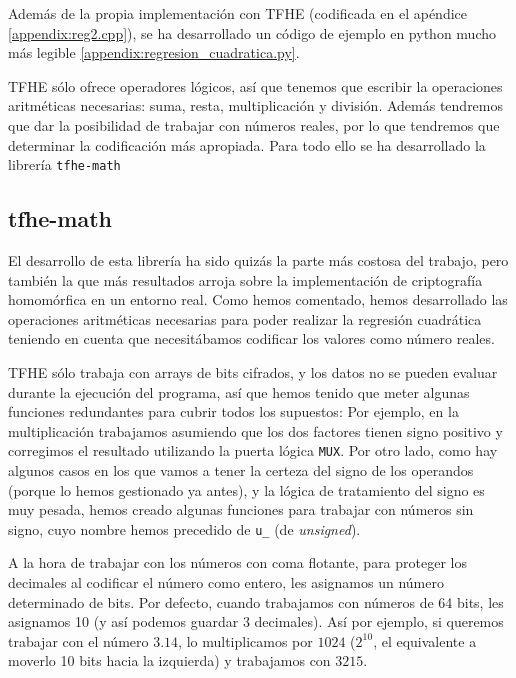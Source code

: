 Además de la propia implementación con TFHE (codificada en el apéndice \ref{appendix:reg2.cpp}), se ha desarrollado un código de ejemplo en python mucho más legible \ref{appendix:regresion_cuadratica.py}.

TFHE sólo ofrece operadores lógicos, así que tenemos que escribir la operaciones aritméticas necesarias: suma, resta, multiplicación y división. Además tendremos que dar la posibilidad de trabajar con números reales, por lo que tendremos que determinar la codificación más apropiada. Para todo ello se ha desarrollado la librería \texttt{tfhe-math}

\subsection{tfhe-math}

El desarrollo de esta librería ha sido quizás la parte más costosa del trabajo, pero también la que más resultados arroja sobre la implementación de criptografía homomórfica en un entorno real. Como hemos comentado, hemos desarrollado las operaciones aritméticas necesarias para poder realizar la regresión cuadrática teniendo en cuenta que necesitábamos codificar los valores como número reales.

TFHE sólo trabaja con arrays de bits cifrados, y los datos no se pueden evaluar durante la ejecución del programa, así que hemos tenido que meter algunas funciones redundantes para cubrir todos los supuestos: Por ejemplo, en la multiplicación trabajamos asumiendo que los dos factores tienen signo positivo y corregimos el resultado utilizando la puerta lógica \texttt{MUX}. Por otro lado, como hay algunos casos en los que vamos a tener la certeza del signo de los operandos (porque lo hemos gestionado ya antes), y la lógica de tratamiento del signo es muy pesada, hemos creado algunas funciones para trabajar con números sin signo, cuyo nombre hemos precedido de \texttt{u\_} (de \textit{unsigned}).

A la hora de trabajar con los números con coma flotante, para proteger los decimales al codificar el número como entero, les asignamos un número determinado de bits. Por defecto, cuando trabajamos con números de 64 bits, les asignamos 10 (y así podemos guardar 3 decimales). Así por ejemplo, si queremos trabajar con el número $ 3.14 $, lo multiplicamos por $ 1024 $ ($ 2^{10} $, el equivalente a moverlo 10 bits hacia la izquierda) y trabajamos con $ 3215 $.


